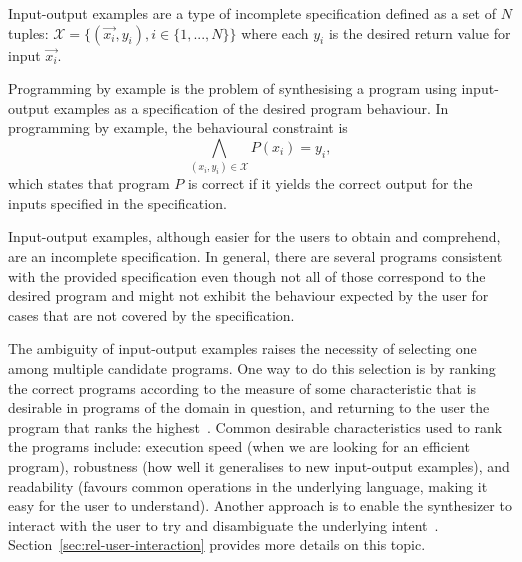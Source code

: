 \begin{definition}
Input-output examples are a type of incomplete specification defined as a set of \(N\) tuples:  \(\mathcal{X} = \{(\vec{x_i}, y_i), i \in \{1, ..., N\}\}\) where each \(y_i\) is the desired return value for input \(\vec{x_i}\).
\end{definition}

\begin{definition}
Programming by example is the problem of synthesising a program using input-output examples as a specification of the desired program behaviour. In programming by example, the behavioural constraint is
\[\bigwedge_{(x_i, y_i) \in \mathcal{X}} P(x_i) = y_i,\]
which states that program \(P\) is correct if it yields the correct output for the inputs specified in the specification.
\end{definition}

\noindent
Input-output examples, although easier for the users to obtain and comprehend, are an incomplete specification. In general, there are several programs consistent with the provided specification even though not all of those correspond to the desired program and might not exhibit the behaviour expected by the user for cases that are not covered by the specification.

The ambiguity of input-output examples raises the necessity of selecting one among multiple candidate programs. One way to do this selection is by ranking the correct programs according to the measure of some characteristic that is desirable in programs of the domain in question, and returning to the user the program that ranks the highest~\cite{UnchartIt20,Regel20,DBLP:conf/ijcai/EllisG17,DBLP:conf/pldi/GveroKKP13,DBLP:conf/oopsla/PolozovG15,DBLP:conf/cav/SinghG15}.
Common desirable characteristics used to rank the programs include: execution speed (when we are looking for an efficient program), robustness (how well it generalises to new input-output examples), and readability (favours common operations in the underlying language, making it easy for the user to understand).
Another approach is to enable the synthesizer to interact with the user to try and disambiguate the underlying intent~\cite{DBLP:conf/sigmod/GulwaniM14,UnchartIt20,DBLP:journals/pvldb/LiCM15,DBLP:conf/sigmod/WangCB17,DBLP:conf/pldi/WangCB17,DBLP:conf/uist/MayerSGLMPSZG15}. Section~\ref{sec:rel-user-interaction} provides more details on this topic.

